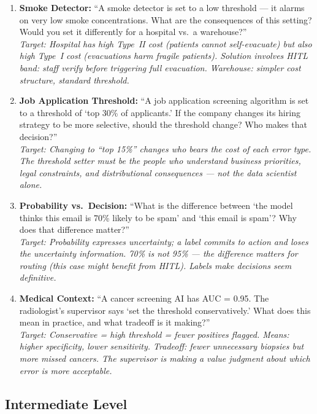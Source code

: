 \begin{enumerate}
    \item \textbf{Smoke Detector:} ``A smoke detector is set to a low threshold --- it alarms on very low smoke concentrations. What are the consequences of this setting? Would you set it differently for a hospital vs.\ a warehouse?''\\
    \textit{Target: Hospital has high Type~II cost (patients cannot self-evacuate) but also high Type~I cost (evacuations harm fragile patients). Solution involves HITL band: staff verify before triggering full evacuation. Warehouse: simpler cost structure, standard threshold.}

    \item \textbf{Job Application Threshold:} ``A job application screening algorithm is set to a threshold of `top 30\% of applicants.' If the company changes its hiring strategy to be more selective, should the threshold change? Who makes that decision?''\\
    \textit{Target: Changing to ``top 15\%'' changes who bears the cost of each error type. The threshold setter must be the people who understand business priorities, legal constraints, and distributional consequences --- not the data scientist alone.}

    \item \textbf{Probability vs.\ Decision:} ``What is the difference between `the model thinks this email is 70\% likely to be spam' and `this email is spam'? Why does that difference matter?''\\
    \textit{Target: Probability expresses uncertainty; a label commits to action and loses the uncertainty information. 70\% is not 95\% --- the difference matters for routing (this case might benefit from HITL). Labels make decisions seem definitive.}

    \item \textbf{Medical Context:} ``A cancer screening AI has AUC = 0.95. The radiologist's supervisor says `set the threshold conservatively.' What does this mean in practice, and what tradeoff is it making?''\\
    \textit{Target: Conservative = high threshold = fewer positives flagged. Means: higher specificity, lower sensitivity. Tradeoff: fewer unnecessary biopsies but more missed cancers. The supervisor is making a value judgment about which error is more acceptable.}
\end{enumerate}

\subsection{Intermediate Level}

